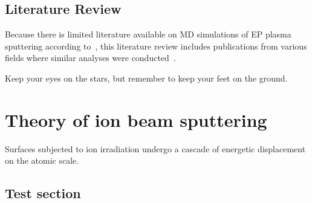 \documentclass[a4paper,twoside]{ociamthesis}
\begin{document}
\section{Literature Review}\label{sec:literature-review}

Because there is limited literature available on MD simulations of EP plasma
sputtering according to~\textcite{jackson2019}, this literature review includes
publications from various fields where similar analyses were
conducted~\autocite{harvey2007}.

\begin{savequote}[8cm]
  Keep your eyes on the stars, but remember to keep your feet on the ground.
  
\end{savequote}

\chapter{\label{ch:theory-of-sputtering}Theory of ion beam sputtering}

\minitoc


Surfaces subjected to ion irradiation undergo a cascade of energetic
displacement on the atomic scale.

\section{Test section}\label{sec:test-section}

% 


\printbibliography
\end{document}
